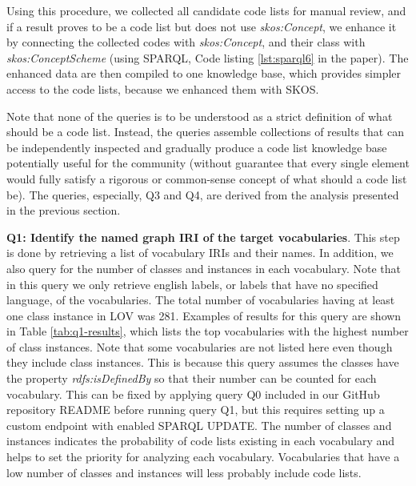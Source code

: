 Using this procedure, we collected all candidate code lists for manual review, and if a result proves to be a code list but does not use \emph{skos:Concept}, we enhance it by connecting the collected codes with \emph{skos:Concept}, and their class with \emph{skos:ConceptScheme} (using SPARQL, Code listing \ref{lst:sparql6} in the paper). The enhanced data are then compiled to one knowledge base, which provides simpler access to the code lists, because we enhanced them with SKOS.



Note that none of the queries is to be understood as a strict definition of what should be a code list.
Instead, the queries assemble collections of results that can be independently inspected and gradually produce a code list knowledge base potentially useful for the community (without guarantee that every single element would fully satisfy a rigorous or common-sense concept of what should a code list be).
The queries, especially, Q3 and Q4, are derived from the analysis presented in the previous section. 

\medskip
\medskip
\noindent\textbf{Q1: Identify the named graph IRI of the target vocabularies}. This step is done by retrieving a list of vocabulary IRIs and their names. In addition, we also query for the number of classes and instances in each vocabulary. Note that in this query we only retrieve english labels, or labels that have no specified language, of the vocabularies. The total number of vocabularies having at least one class instance in LOV was 281. Examples of results for this query are shown in Table \ref{tab:q1-results}, which lists the top vocabularies with the highest number of class instances. Note that some vocabularies are not listed here even though they include class instances. This is because this query assumes the classes have the property \textit{rdfs:isDefinedBy} so that their number can be counted for each vocabulary. This can be fixed by applying query Q0 included in our GitHub repository README before running query Q1, but this requires setting up a custom endpoint with enabled SPARQL UPDATE. The number of classes and instances indicates the probability of code lists existing in each vocabulary and helps to set the priority for analyzing each vocabulary. Vocabularies that have a low number of classes and instances will less probably include code lists. %

